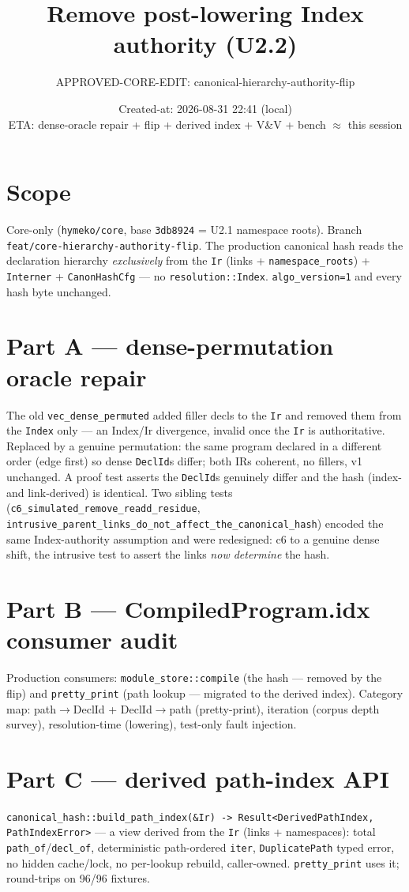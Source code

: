 \documentclass[11pt]{article}
\title{Remove post-lowering Index authority (U2.2)}
\author{APPROVED-CORE-EDIT: canonical-hierarchy-authority-flip}
\date{Created-at: 2026-08-31 22:41 (local) \\ ETA: dense-oracle repair + flip + derived index + V\&V + bench $\approx$ this session}
\begin{document}
\maketitle

\section*{Scope}
Core-only (\texttt{hymeko/core}, base \texttt{3db8924} = U2.1 namespace roots).
Branch \texttt{feat/core-hierarchy-authority-flip}. The production canonical hash
reads the declaration hierarchy \emph{exclusively} from the \texttt{Ir}
(links + \texttt{namespace\_roots}) + \texttt{Interner} + \texttt{CanonHashCfg} —
no \texttt{resolution::Index}. \texttt{algo\_version=1} and every hash byte
unchanged.

\section*{Part A --- dense-permutation oracle repair}
The old \texttt{vec\_dense\_permuted} added filler decls to the \texttt{Ir} and
removed them from the \texttt{Index} only — an Index/Ir divergence, invalid once
the \texttt{Ir} is authoritative. Replaced by a genuine permutation: the same
program declared in a different order (edge first) so dense \texttt{DeclId}s
differ; both IRs coherent, no fillers, v1 unchanged. A proof test asserts the
\texttt{DeclId}s genuinely differ and the hash (index- and link-derived) is
identical. Two sibling tests (\texttt{c6\_simulated\_remove\_readd\_residue},
\texttt{intrusive\_parent\_links\_do\_not\_affect\_the\_canonical\_hash}) encoded
the same Index-authority assumption and were redesigned: c6 to a genuine dense
shift, the intrusive test to assert the links \emph{now determine} the hash.

\section*{Part B --- CompiledProgram.idx consumer audit}
Production consumers: \texttt{module\_store::compile} (the hash — removed by the
flip) and \texttt{pretty\_print} (path lookup — migrated to the derived index).
Category map: path$\to$DeclId + DeclId$\to$path (pretty-print), iteration
(corpus depth survey), resolution-time (lowering), test-only fault injection.

\section*{Part C --- derived path-index API}
\texttt{canonical\_hash::build\_path\_index(\&Ir) -> Result<DerivedPathIndex,
PathIndexError>} — a view derived from the \texttt{Ir} (links + namespaces): total
\texttt{path\_of}/\texttt{decl\_of}, deterministic path-ordered \texttt{iter},
\texttt{DuplicatePath} typed error, no hidden cache/lock, no per-lookup rebuild,
caller-owned. \texttt{pretty\_print} uses it; round-trips on 96/96 fixtures.
\end{document}

